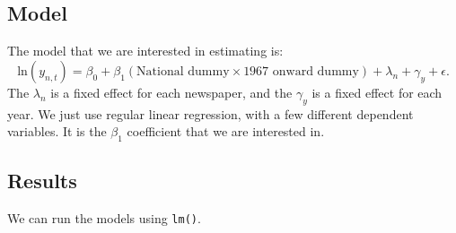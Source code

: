 \documentclass[
]{book}
\begin{document}
\hypertarget{model}{%
\subsection{Model}\label{model}}

The model that we are interested in estimating is:
\[\mbox{ln}(y_{n,t}) = \beta_0 + \beta_1(\mbox{National dummy}\times\mbox{1967 onward dummy}) + \lambda_n + \gamma_y + \epsilon.\]
The \(\lambda_n\) is a fixed effect for each newspaper, and the \(\gamma_y\) is a fixed effect for each year. We just use regular linear regression, with a few different dependent variables. It is the \(\beta_1\) coefficient that we are interested in.

\hypertarget{results}{%
\subsection{Results}\label{results}}

We can run the models using \texttt{lm()}.
\end{document}
